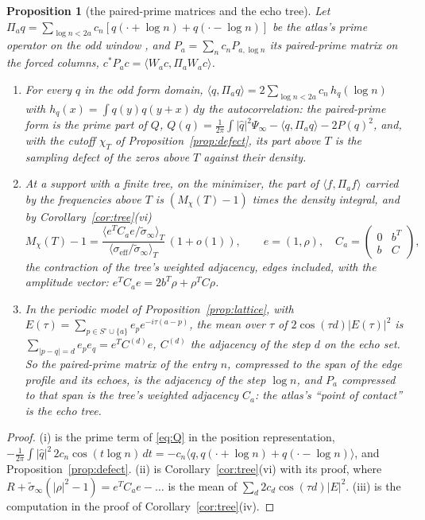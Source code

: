 \documentclass[11pt]{article}
\newtheorem{proposition}[theorem]{Proposition}
\theoremstyle{definition}
\theoremstyle{remark}
\begin{document}
\begin{proposition}[the paired-prime matrices and the echo tree]\label{prop:paired}
Let $\Pi_aq=\sum_{\log n<2a}c_n[q(\cdot+\log n)+q(\cdot-\log n)]$ be the atlas's prime operator on the odd window \cite[CP19 (3.3)]{michaels-atlas}, and $P_a=\sum_nc_nP_{a,\log n}$ its paired-prime matrix on the forced columns, $c^*P_ac=\langle W_ac,\Pi_aW_ac\rangle$.
\begin{enumerate}
\item[(i)] For every $q$ in the odd form domain, $\langle q,\Pi_aq\rangle=2\sum_{\log n<2a}c_n\,h_q(\log n)$ with $h_q(x)=\int q(y)q(y+x)\,dy$ the autocorrelation: the paired-prime form is the prime part of $Q$, $Q(q)=\frac1{2\pi}\int|\hat q|^2\Psi_\infty-\langle q,\Pi_aq\rangle-2P(q)^2$, and, with the cutoff $\chi_T$ of Proposition~\ref{prop:defect}, its part above $T$ is the sampling defect of the zeros above $T$ against their density.
\item[(ii)] At a support with a finite tree, on the minimizer, the part of $\langle f,\Pi_af\rangle$ carried by the frequencies above $T$ is $(M_\chi(T)-1)$ times the density integral, and by Corollary~\ref{cor:tree}(vi)
\[
M_\chi(T)-1=\frac{\langle e^TC_ae/\tilde\sigma_\infty\rangle_T}{\langle\sigma_{\mathrm{eff}}/\tilde\sigma_\infty\rangle_T}\,(1+o(1)),\qquad e=(1,\rho),\quad C_a=\begin{pmatrix}0&b^T\\ b&C\end{pmatrix},
\]
the contraction of the tree's weighted adjacency, edges included, with the amplitude vector: $e^TC_ae=2b^T\rho+\rho^TC\rho$.
\item[(iii)] In the periodic model of Proposition~\ref{prop:lattice}, with $E(\tau)=\sum_{p\in S^\circ\cup\{a\}}e_pe^{-i\tau(a-p)}$, the mean over $\tau$ of $2\cos(\tau d)|E(\tau)|^2$ is $\sum_{|p-q|=d}e_pe_q=e^TC^{(d)}e$, $C^{(d)}$ the adjacency of the step $d$ on the echo set. So the paired-prime matrix of the entry $n$, compressed to the span of the edge profile and its echoes, is the adjacency of the step $\log n$, and $P_a$ compressed to that span is the tree's weighted adjacency $C_a$: the atlas's ``point of contact'' is the echo tree.
\end{enumerate}
\end{proposition}
\begin{proof}
(i) is the prime term of \eqref{eq:Q} in the position representation, $-\frac1{2\pi}\int|\hat q|^2\,2c_n\cos(t\log n)\,dt=-c_n\langle q,q(\cdot+\log n)+q(\cdot-\log n)\rangle$, and Proposition~\ref{prop:defect}. (ii) is Corollary~\ref{cor:tree}(vi) with its proof, where $R+\tilde\sigma_\infty(|\rho|^2-1)=e^TC_ae-\dots$ is the mean of $\sum_d2c_d\cos(\tau d)|E|^2$. (iii) is the computation in the proof of Corollary~\ref{cor:tree}(iv).
\end{proof}
\end{document}
